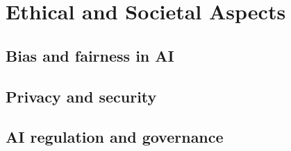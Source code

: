 ﻿\chapter{Ethical and Societal Aspects}
\section{Bias and fairness in AI}

\section{Privacy and security}

\section{AI regulation and governance}


